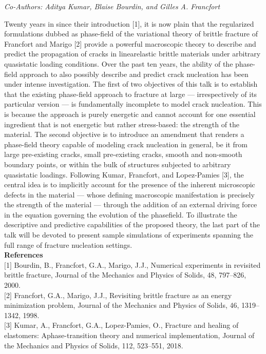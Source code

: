 \begin{center}
\textit{Co-Authors: Aditya Kumar, Blaise Bourdin, and Gilles A. Francfort}
\end{center} 
Twenty years in since their introduction [1], it is now plain that the regularized formulations dubbed as phase-field of the variational theory of brittle fracture of Francfort and Marigo [2] provide a powerful macroscopic theory to describe and predict the propagation of cracks in linearelastic brittle materials under arbitrary quasistatic loading conditions. Over the past ten years, the ability of the phase-field approach to also possibly describe and predict crack nucleation has been under intense investigation. The first of two objectives of this talk is to establish that the existing phase-field approach to fracture at large — irrespectively of its particular version — is fundamentally incomplete to model crack nucleation. This is because the approach is purely energetic and cannot account for one essential ingredient that is not energetic but rather stress-based: the strength of the material. The second objective is to introduce an amendment that renders a phase-field theory capable of modeling crack nucleation in general, be it from large pre-existing cracks, small pre-existing cracks, smooth and non-smooth boundary points, or within the bulk of structures subjected to arbitrary quasistatic loadings. Following Kumar, Francfort, and Lopez-Pamies [3], the central idea is to implicitly account for the presence of the inherent microscopic defects in the material — whose defining macroscopic manifestation is precisely the strength of the material — through the addition of an external driving force in the equation governing the evolution of the phasefield. To illustrate the descriptive and predictive capabilities of the proposed theory, the last part of the talk will be devoted to present sample simulations of experiments spanning the full range of fracture nucleation settings.\\

\noindent\textbf{References}\\
$[$1$]$ Bourdin, B., Francfort, G.A., Marigo, J.J., Numerical experiments in revisited brittle fracture, Journal of the Mechanics and Physics of Solids, 48, 797–826, 2000.\\\newline
$[$2$]$ Francfort, G.A., Marigo, J.J., Revisiting brittle fracture as an energy minimization problem, Journal of the Mechanics and Physics of Solids, 46, 1319–1342, 1998.\\\newline
$[$3$]$ Kumar, A., Francfort, G.A., Lopez-Pamies, O., Fracture and healing of elastomers: Aphase-transition theory and numerical implementation, Journal of the Mechanics and Physics of Solids, 112, 523–551, 2018.



